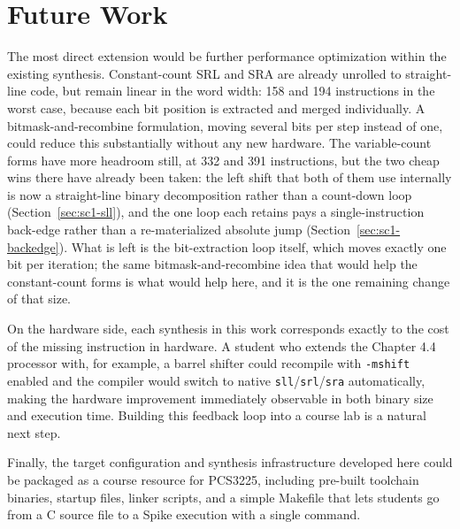 \section{Future Work}

The most direct extension would be further performance optimization within the existing synthesis.
Constant-count SRL and SRA are already unrolled to straight-line code, but remain linear in the word
width: 158 and 194 instructions in the worst case, because each bit position is extracted and merged
individually. A bitmask-and-recombine formulation, moving several bits per step instead of one, could
reduce this substantially without any new hardware. The variable-count forms have more headroom still,
at 332 and 391 instructions, but the two cheap wins there have already been taken: the left shift that
both of them use internally is now a straight-line binary decomposition rather than a count-down loop
(Section~\ref{sec:sc1-sll}), and the one loop each retains pays a single-instruction back-edge rather
than a re-materialized absolute jump (Section~\ref{sec:sc1-backedge}). What is left is the
bit-extraction loop itself, which moves exactly one bit per iteration; the same bitmask-and-recombine
idea that would help the constant-count forms is what would help here, and it is the one remaining
change of that size.

On the hardware side, each synthesis in this work corresponds exactly to the cost of the missing
instruction in hardware. A student who extends the Chapter 4.4 processor with, for example, a barrel
shifter could recompile with \texttt{-mshift} enabled and the compiler would switch to native
\texttt{sll}/\texttt{srl}/\texttt{sra} automatically, making the hardware improvement immediately
observable in both binary size and execution time. Building this feedback loop into a course lab
is a natural next step.

Finally, the target configuration and synthesis infrastructure developed here could be packaged as a
course resource for PCS3225, including pre-built toolchain binaries, startup files, linker scripts,
and a simple Makefile that lets students go from a C source file to a Spike execution
with a single command.
